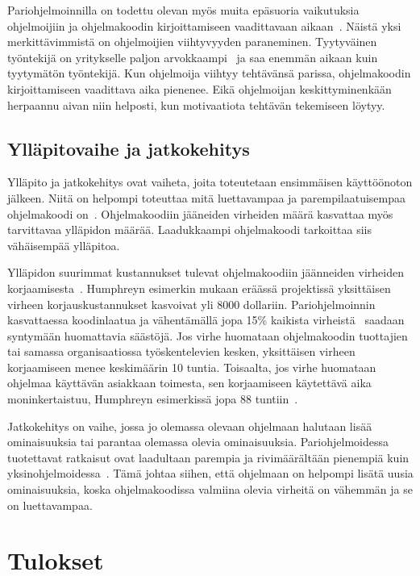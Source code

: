 \documentclass[finnish]{tktltiki2}
\theoremstyle{definition}
\theoremstyle{remark}
\begin{document}
Pariohjelmoinnilla on todettu olevan myös muita epäsuoria vaikutuksia ohjelmoijiin ja ohjelmakoodin kirjoittamiseen vaadittavaan aikaan~\cite{case}. Näistä yksi merkittävimmistä on ohjelmoijien viihtyvyyden paraneminen. Tyytyväinen työntekijä on yritykselle paljon arvokkaampi~\cite{airo2008oma} ja saa enemmän aikaan kuin tyytymätön työntekijä. Kun ohjelmoija viihtyy tehtävänsä parissa, ohjelmakoodin kirjoittamiseen vaadittava aika pienenee. Eikä ohjelmoijan keskittyminenkään herpaannu aivan niin helposti, kun motivaatiota tehtävän tekemiseen löytyy.

\subsection{Ylläpitovaihe ja jatkokehitys}

Ylläpito ja jatkokehitys ovat vaiheta, joita toteutetaan ensimmäisen käyttöönoton jälkeen. Niitä on helpompi toteuttaa mitä luettavampaa ja parempilaatuisempaa ohjelmakoodi on~\cite{costandbenefit2}. Ohjelmakoodiin jääneiden virheiden määrä kasvattaa myös tarvittavaa ylläpidon määrää. Laadukkaampi ohjelmakoodi tarkoittaa siis vähäisempää ylläpitoa.

Ylläpidon suurimmat kustannukset tulevat ohjelmakoodiin jäänneiden virheiden korjaamisesta~\cite{humphrey1994disciplined}. Humphreyn esimerkin mukaan eräässä projektissä yksittäisen virheen korjauskustannukset kasvoivat yli 8000 dollariin. Pariohjelmoinnin kasvattaessa koodinlaatua ja vähentämällä jopa 15\% kaikista virheistä~\cite{costandbenefit2} saadaan syntymään huomattavia säästöjä. Jos virhe huomataan ohjelmakoodin tuottajien tai samassa organisaatiossa työskentelevien kesken, yksittäisen virheen korjaamiseen menee keskimäärin 10 tuntia. Toisaalta, jos virhe huomataan ohjelmaa käyttävän asiakkaan toimesta, sen korjaamiseen käytettävä aika moninkertaistuu, Humphreyn esimerkissä jopa 88 tuntiin~\cite{humphrey1994disciplined}.

Jatkokehitys on vaihe, jossa jo olemassa olevaan ohjelmaan halutaan lisää ominaisuuksia tai parantaa olemassa olevia ominaisuuksia. Pariohjelmoidessa tuotettavat ratkaisut ovat laadultaan parempia ja rivimäärältään pienempiä kuin yksinohjelmoidessa~\cite{costandbenefit2}. Tämä johtaa siihen, että ohjelmaan on helpompi lisätä uusia ominaisuuksia, koska ohjelmakoodissa valmiina olevia virheitä on vähemmän ja se on luettavampaa.

\section{Tulokset}
\end{document}
